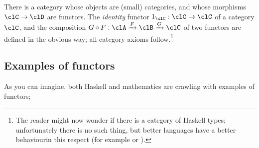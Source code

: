 \documentclass[11pt]{article}
\begin{document}
\begin{remark}
	There is a category whose objects are (small) categories, and whose morphisms $\clC\to \clD$ are functors. The \emph{identity} functor $1_{\clC} : \clC \to \clC$ of a category $\clC$, and the composition $G\circ F : \clA \xrightarrow{F} \clB \xrightarrow{G} \clC$ of two functors are defined in the obvious way; all category axioms follow.\footnote{The reader might now wonder if there is a category of Haskell types; unfortunately there is no such thing, but better languages have a better behaviourin this respect (for example  or ).}
\end{remark}
\subsection{Examples of functors}
As you can imagine, both Haskell and mathematics are crawling with examples of functors;
\end{document}
